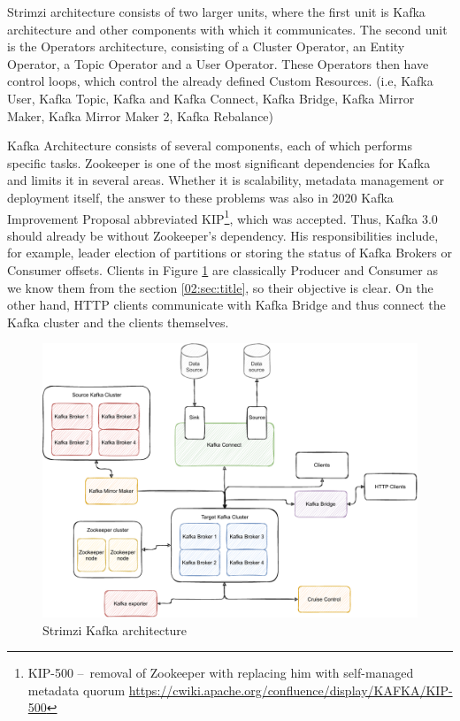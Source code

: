 Strimzi architecture consists of two larger units, where the first unit is Kafka architecture and other components with which it communicates. The second unit is the Operators architecture, consisting of a Cluster Operator, an Entity Operator, a Topic Operator and a User Operator. These Operators then have control loops, which control the already defined Custom Resources. (i.e, Kafka User, Kafka Topic, Kafka and Kafka Connect, Kafka Bridge, Kafka Mirror Maker, Kafka Mirror Maker 2, Kafka Rebalance)

Kafka Architecture consists of several components, each of which performs specific tasks. Zookeeper is one of the most significant dependencies for Kafka and limits it in several areas. Whether it is scalability, metadata management or deployment itself, the answer to these problems was also in 2020 Kafka Improvement Proposal abbreviated KIP\footnote{KIP-500 \---\ removal of Zookeeper with replacing him with self-managed metadata quorum \url{https://cwiki.apache.org/confluence/display/KAFKA/KIP-500}}, which was accepted. Thus, Kafka 3.0 should already be without Zookeeper's dependency. His responsibilities include, for example, leader election of partitions or storing the status of Kafka Brokers or Consumer offsets. Clients in Figure \ref{03:fig:strimziKafkaArchitecture} are classically Producer and Consumer as we know them from the section \ref{02:sec:title}, so their objective is clear. On the other hand, HTTP clients communicate with Kafka Bridge and thus connect the Kafka cluster and the clients themselves. 
\begin{figure}[!ht]
    \centering
    \includegraphics[scale=0.75]{obrazky-figures/02-preliminaries/03-strimzi/03-strimzi-kafka-architecture (1).pdf}
    \caption{Strimzi Kafka architecture}
    \label{03:fig:strimziKafkaArchitecture}
\end{figure}
